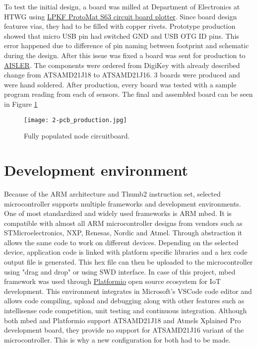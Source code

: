 To test the initial design, a board was milled at Department of Electronics at \ac{HTWG} using \href{http://www.lpkf.com/products/rapid-pcb-prototyping/circuit-board-plotter/protomat-s63.htm}{LPKF ProtoMat S63 circuit board plotter}. Since board design features vias, they had to be filled with copper rivets. Prototype production showed that micro USB pin had switched GND and USB OTG ID pins. This error happened due to difference of pin naming between footprint and schematic during the design. After this issue was fixed a board was sent for production to \href{https://aisler.net/}{AISLER}. The components were ordered from DigiKey with already described change from ATSAMD21J18 to ATSAMD21J16. 3 boards were produced and were hand soldered. After production, every board was tested with a sample program reading from each of sensors. The final and assembled board can be seen in Figure \ref{fig:pcb_production}

\begin{figure}[h]
  \begin{center}
    \texttt{[image: 2-pcb\_production.jpg]}
  \end{center}
  \caption{Fully populated node circuitboard.}
  \label{fig:pcb_production}
\end{figure}


\section{Development environment}

Because of the ARM architecture and Thumb2 instruction set, selected microcontroller supports multiple frameworks and development environments. One of most standardized and widely used frameworks is ARM mbed. It is compatible with almost all ARM microcontroller designs from vendors such as STMicroelectronics, NXP, Renesas, Nordic and Atmel\cite{mbed_devices}. Through abstraction it allows the same code to work on different devices. Depending on the selected device, application code is linked with platform specific libraries and a hex code output file is generated. This hex file can then be uploaded to the microcontroller using "drag and drop" or using \ac{SWD} interface\cite{SWD}. In case of this project, mbed framework was used through \href{http://platformio.org}{Platformio} open source ecosystem for \ac{IoT} development. This environment integrates in Microsoft's VSCode code editor and allows code compiling, upload and debugging along with other features such as intellisense code competition, unit testing and continuous integration. Although both mbed and Platformio support ATSAMD21J18 and Atmels Xplained Pro development board, they provide no support for ATSAMD21J16 variant of the microcontroller. This is why a new configuration for both had to be made.

